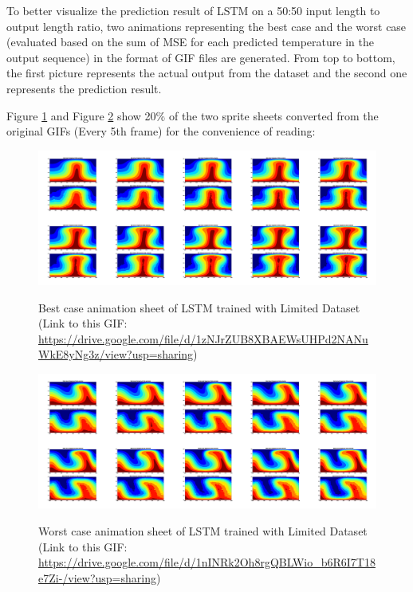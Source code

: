 To better visualize the prediction result of LSTM on a 50:50 input length to output length ratio, two animations representing the best case and the worst case (evaluated based on the sum of MSE for each predicted temperature in the output sequence) in the format of GIF files are generated. From top to bottom, the first picture represents the actual output from the dataset and the second one represents the prediction result.

Figure \ref{figure:LSTM_limited_best_gif} and Figure \ref{figure:LSTM_limited_worst_gif} show 20\% of the two sprite sheets converted from the original GIFs (Every 5th frame) for the convenience of reading:

\begin{figure}[H]
    \centering
    \caption{Best case animation sheet of LSTM trained with Limited Dataset (Link to this GIF: \url{https://drive.google.com/file/d/1zNJrZUB8XBAEWsUHPd2NANuWkE8yNg3z/view?usp=sharing})}
    \includegraphics[scale=0.10]{figures/mantle_convection_images/limited_dataset/LSTM_Best_GIF_sheet.png}
    \label{figure:LSTM_limited_best_gif}
\end{figure}



\begin{figure}[H]
    \centering
    \caption{Worst case animation sheet of LSTM trained with Limited Dataset (Link to this GIF: 
    \url{https://drive.google.com/file/d/1nINRk2Oh8rgQBLWio_b6R6I7T18e7Zi-/view?usp=sharing})}
    \includegraphics[scale=0.10]{figures/mantle_convection_images/limited_dataset/LSTM_Worst_GIF_sheet.png}
    \label{figure:LSTM_limited_worst_gif}
\end{figure}

